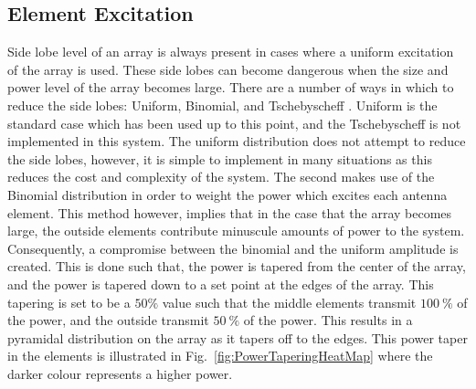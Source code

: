 \documentclass[11pt]{witseiepaper}
\begin{document}
\subsection{Element Excitation} \label{sec:ElementExcitation}
Side lobe level of an array is always present in cases where a uniform excitation of the array is used. These side lobes can become dangerous when the size and power level of the array becomes large.
There are a number of ways in which to reduce the side lobes: Uniform, Binomial, and Tschebyscheff \cite[p.~324-325]{Balanis}. Uniform is the standard case which has been used up to this point, and the Tschebyscheff is not implemented in this system. The uniform distribution does not attempt to reduce the side lobes, however, it is simple to implement in many situations as this reduces the cost and complexity of the system.
The second makes use of the Binomial distribution in order to weight the power which excites each antenna element.
This method however, implies that in the case that the array becomes large, the outside elements contribute minuscule amounts of power to the system.
Consequently, a compromise between the binomial and the uniform amplitude is created.
This is done such that, the power is tapered from the center of the array, and the power is tapered down to a set point at the edges of the array. This tapering is set to be a $50 \%$ value such that the middle elements transmit $100~\%$ of the power, and the outside transmit $50~\%$ of the power. This results in a pyramidal distribution on the array as it tapers off to the edges.
This power taper in the elements is illustrated in Fig.~\ref{fig:PowerTaperingHeatMap} where the darker colour represents a higher power.
\end{document}
